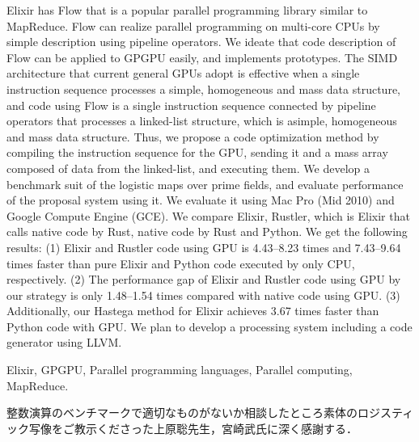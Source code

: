 \documentclass[submit,techrep]{ipsj}
\begin{document}
\begin{eabstract}
Elixir has Flow that is a popular parallel programming library similar to MapReduce. Flow can realize parallel programming on multi-core CPUs by simple description using pipeline operators. We ideate that code description of Flow can be applied to GPGPU easily, and implements prototypes. The SIMD architecture that current general GPUs adopt is effective when a single instruction sequence processes a simple, homogeneous and mass data structure, and code using Flow is a single instruction sequence connected by pipeline operators that processes a linked-list structure, which is asimple, homogeneous and mass data structure. Thus, we propose a code optimization method by compiling the instruction sequence for the GPU, sending it and a mass array composed of data from the linked-list, and executing them. We develop a benchmark suit of the logistic maps over prime fields, and evaluate performance of the proposal system using it. We evaluate it using Mac Pro (Mid 2010) and Google Compute Engine (GCE). We compare Elixir, Rustler, which is Elixir that calls native code by Rust, native code by Rust and Python. We get the following results: (1) Elixir and Rustler code using GPU is 4.43--8.23 times and 7.43--9.64 times faster than pure Elixir and Python code executed by only CPU, respectively. (2) The performance gap of Elixir and Rustler code using GPU by our strategy is only 1.48--1.54 times compared with native code using GPU. (3) Additionally, our Hastega method for Elixir achieves 3.67 times faster than Python code with GPU. We plan to develop a processing system including a code generator using LLVM.
\end{eabstract}

\begin{ekeyword}
Elixir, GPGPU, Parallel programming languages, Parallel computing, MapReduce.
\end{ekeyword}

\maketitle



\begin{acknowledgment}
整数演算のベンチマークで適切なものがないか相談したところ素体のロジスティック写像\cite{Miyazaki14}をご教示くださった上原聡先生，宮崎武氏に深く感謝する．
\end{acknowledgment}




\end{document}
